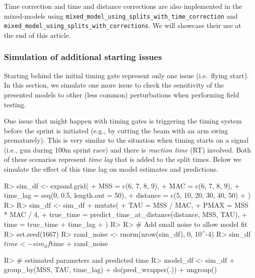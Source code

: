 \documentclass[
]{jss}
\begin{document}
Time correction and time and distance corrections are also implemented in the mixed-models using \texttt{mixed\_model\_using\_splits\_with\_time\_correction} and \texttt{mixed\_model\_using\_splits\_with\_corrections}. We will showcase their use at the end of this article.

\hypertarget{simulation-of-additional-starting-issues}{%
\subsubsection{Simulation of additional starting issues}\label{simulation-of-additional-starting-issues}}

Starting behind the initial timing gate represent only one issue (i.e.~flying start). In this section, we simulate one more issue to check the sensitivity of the presented models to other (less common) perturbations when performing field testing.

One issue that might happen with timing gates is triggering the timing system before the sprint is initiated (e.g., by cutting the beam with an arm swing prematurely). This is very similar to the situation when timing starts on a signal (i.e., gun during 100m sprint race) and there is \emph{reaction time} (RT) involved. Both of these scenarios represent \emph{time lag} that is added to the split times. Below we simulate the effect of this time lag on model estimates and predictions.

\begin{CodeChunk}
\begin{CodeInput}
R> sim_df <- expand.grid(
+   MSS = c(6, 7, 8, 9),
+   MAC = c(6, 7, 8, 9),
+   time_lag = seq(0, 0.5, length.out = 50),
+   distance = c(5, 10, 20, 30, 40, 50)
+ )
R> 
R> sim_df <- sim_df %
+   mutate(
+     TAU = MSS / MAC,
+     PMAX = MSS * MAC / 4,
+     true_time = predict_time_at_distance(distance, MSS, TAU),
+     time = true_time + time_lag
+   )
R> 
R> # Add small noise to allow model fit
R> set.seed(1667)
R> rand_noise <- rnorm(nrow(sim_df), 0, 10^-4)
R> sim_df$time <- sim_df$time + rand_noise
\end{CodeInput}
\end{CodeChunk}

\begin{CodeChunk}
\begin{CodeInput}
R> # estimated parameters and predicted time
R> model_df <- sim_df %
+   group_by(MSS, TAU, time_lag) %
+   do(pred_wrapper(.)) %
+   ungroup()
\end{CodeInput}
\end{CodeChunk}
\end{document}
